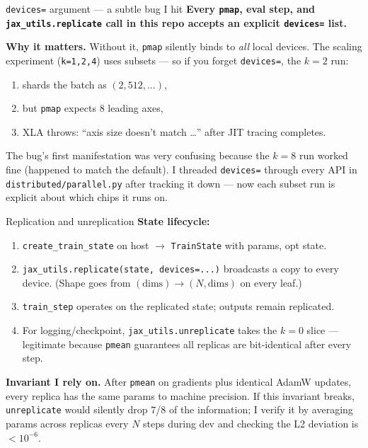 \documentclass[aspectratio=169,10pt]{beamer}
\begin{document}
\begin{frame}{\texttt{devices=} argument — a subtle bug I hit}
  \textbf{Every \texttt{pmap}, eval step, and \texttt{jax\_utils.replicate} call in this
  repo accepts an explicit \texttt{devices=} list.}

  \vspace{0.4em}
  \textbf{Why it matters.} Without it, \texttt{pmap} silently binds to \emph{all} local
  devices. The scaling experiment (\texttt{k=1,2,4}) uses subsets — so if you forget
  \texttt{devices=}, the $k=2$ run:
  \begin{enumerate}\small
    \item shards the batch as $(2, 512, \ldots)$,
    \item but \texttt{pmap} expects 8 leading axes,
    \item XLA throws: ``axis size doesn't match \ldots'' after JIT tracing completes.
  \end{enumerate}

  \vspace{0.4em}
  The bug's first manifestation was very confusing because the $k=8$ run worked fine
  (happened to match the default). I threaded \texttt{devices=} through every API in
  \texttt{distributed/parallel.py} after tracking it down — now each subset run is
  explicit about which chips it runs on.
\end{frame}

\begin{frame}{Replication and unreplication}
  \textbf{State lifecycle:}
  \begin{enumerate}
    \item \texttt{create\_train\_state} on host $\to$ \texttt{TrainState} with params, opt state.
    \item \texttt{jax\_utils.replicate(state, devices=...)} broadcasts a copy to every device.
          (Shape goes from $(\text{dims})\to(N,\text{dims})$ on every leaf.)
    \item \texttt{train\_step} operates on the replicated state; outputs remain replicated.
    \item For logging/checkpoint, \texttt{jax\_utils.unreplicate} takes the $k=0$ slice —
          legitimate because \texttt{pmean} guarantees all replicas are bit-identical after
          every step.
  \end{enumerate}

  \vspace{0.4em}
  \textbf{Invariant I rely on.} After \texttt{pmean} on gradients plus identical AdamW
  updates, every replica has the same params to machine precision. If this invariant
  breaks, \texttt{unreplicate} would silently drop 7/8 of the information; I verify it
  by averaging params across replicas every $N$ steps during dev and checking the L2
  deviation is $<10^{-6}$.
\end{frame}
\end{document}
